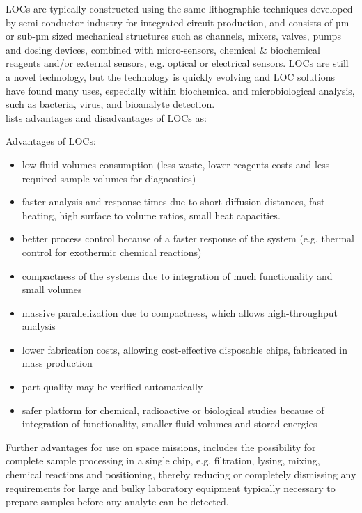 LOCs are typically constructed using the same lithographic techniques developed by semi-conductor industry for integrated circuit production, and consists of µm or sub-µm sized mechanical structures such as channels, mixers, valves, pumps and dosing devices, combined with micro-sensors, chemical \& biochemical reagents and/or external sensors, e.g. optical or electrical sensors. LOCs are still a novel technology, but the technology is quickly evolving and LOC solutions have found many uses, especially within biochemical and microbiological analysis, such as bacteria, virus, and bioanalyte detection. \\
\cite{Ghallab2004} \cite{Pawell2013} \cite{Pawell2015} lists advantages and disadvantages of LOCs as:

Advantages of LOCs:
\begin{itemize}
    \item low fluid volumes consumption (less waste, lower reagents costs and less required sample volumes for diagnostics)
    \item faster analysis and response times due to short diffusion distances, fast heating, high surface to volume ratios, small heat capacities.
    \item better process control because of a faster response of the system (e.g. thermal control for exothermic chemical reactions)
    \item compactness of the systems due to integration of much functionality and small volumes
    \item massive parallelization due to compactness, which allows high-throughput analysis
    \item lower fabrication costs, allowing cost-effective disposable chips, fabricated in mass production
    \item part quality may be verified automatically
    \item safer platform for chemical, radioactive or biological studies because of integration of functionality, smaller fluid volumes and stored energies
\end{itemize}
Further advantages for use on space missions, includes the possibility for complete sample processing in a single chip, e.g. filtration, lysing, mixing, chemical reactions and positioning, thereby reducing or completely dismissing any requirements for large and bulky laboratory equipment typically necessary to prepare samples before any analyte can be detected.

